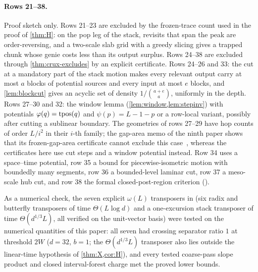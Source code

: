 \paragraph{Rows 21--38.} Proof sketch only. Rows 21--23 are excluded by the frozen-trace count used in the proof of \cref{thm:H}: on the pop
leg of the stack, revisits that span the peak are order-reversing, and a two-scale slab grid with a greedy slicing gives a trapped chunk whose
genie costs less than its output surplus. Rows 24--38 are excluded through \cref{thm:crux-excludes} by an explicit certificate. Rows 24--26 and 33:
the cut at a mandatory part of the stack motion makes every relevant output carry at most $a$ blocks of potential sources and every input
at most $e$ blocks, and \cref{lem:blockcut} gives an acyclic set of density $1/\binom{a+e}{a}$, uniformly in the depth. Rows 27--30 and 32: the
window lemma (\cref{lem:window,lem:stepinv}) with potentials $\varphi(q)=\mathrm{tpos}(q)$ and $\psi(p)=L-1-p$ or a row-local variant, possibly after
cutting a sublinear boundary. The geometries of rows 27--29 have hop counts of order $L/i^2$ in their $i$-th family; the gap-area memo of the
ninth paper shows that its frozen-gap-area certificate cannot exclude this case~\cite{GapAreaMemo2026}, whereas the certificates here use cut
steps and a window potential instead. Row 34 uses a space--time potential, row 35 a bound for piecewise-isometric motion with boundedly many
segments, row 36 a bounded-level laminar cut, row 37 a meso-scale hub cut, and row 38 the formal closed-post-region criterion
().

As a numerical check, the seven explicit $\omega(L)$ transposers in  (six radix and butterfly transposers of time
$\Theta(L\log d)$ and a one-excursion stack transposer of time $\Theta(d^{1/3}L)$, all verified on the unit-vector basis) were tested on
the numerical quantities of this paper: all seven had crossing separator ratio $1$ at threshold $2W$ ($d=32$, $b=1$; the
$\Theta(d^{1/3}L)$ transposer also lies outside the linear-time hypothesis of \cref{thm:X,cor:H}), and every tested coarse-pass slope
product and closed interval-forest charge met the proved lower bounds.

